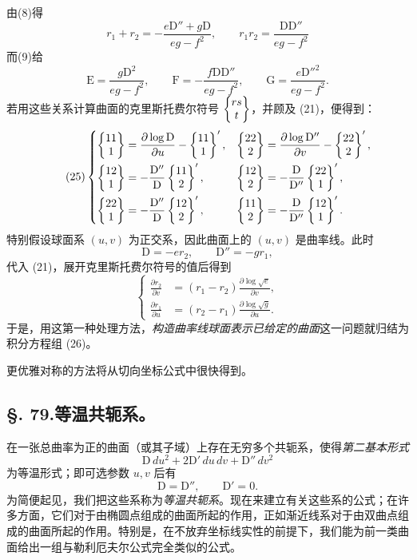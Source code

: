 由(8)得
\begin{equation}\tag{23}
 r_1+r_2=-\frac{e\mathrm D''+g\mathrm D}{eg-f^2},
 \qquad
 r_1r_2=\frac{\mathrm D\mathrm D''}{eg-f^2}
\end{equation}
而(9)给
\begin{equation}\tag{24}
 \mathrm E=\frac{g\mathrm D^2}{eg-f^2},
 \qquad
 \mathrm F=-\frac{f\mathrm D\mathrm D''}{eg-f^2},
 \qquad
 \mathrm G=\frac{e\mathrm D''^2}{eg-f^2}.
\end{equation}
若用这些关系计算曲面的克里斯托费尔符号 \(\left\{\begin{matrix}rs\\t\end{matrix}\right\}\)，并顾及 (21)，便得到：
\begin{equation}\tag{25}
\left\{
\begin{aligned}
\left\{\begin{matrix}11\\1\end{matrix}\right\}&=\frac{\partial\log\mathrm D}{\partial u}-\left\{\begin{matrix}11\\1\end{matrix}\right\}',
&
\left\{\begin{matrix}22\\2\end{matrix}\right\}&=\frac{\partial\log\mathrm D''}{\partial v}-\left\{\begin{matrix}22\\2\end{matrix}\right\}',\\
\left\{\begin{matrix}12\\1\end{matrix}\right\}&=-\frac{\mathrm D''}{\mathrm D}\left\{\begin{matrix}11\\2\end{matrix}\right\}',
&
\left\{\begin{matrix}12\\2\end{matrix}\right\}&=-\frac{\mathrm D}{\mathrm D''}\left\{\begin{matrix}22\\1\end{matrix}\right\}',\\
\left\{\begin{matrix}22\\1\end{matrix}\right\}&=-\frac{\mathrm D''}{\mathrm D}\left\{\begin{matrix}12\\2\end{matrix}\right\}',
&
\left\{\begin{matrix}11\\2\end{matrix}\right\}&=-\frac{\mathrm D}{\mathrm D''}\left\{\begin{matrix}12\\1\end{matrix}\right\}'.
\end{aligned}\right.
\end{equation}
特别假设球面系 \((u,v)\) 为正交系，因此曲面上的 \((u,v)\) 是曲率线。此时
\[
 \mathrm D=-er_2,
 \qquad
 \mathrm D''=-gr_1,
\]
代入 (21)，展开克里斯托费尔符号的值后得到
\begin{equation}\tag{26}
\left\{
\begin{aligned}
\frac{\partial r_2}{\partial v}&=(r_1-r_2)\frac{\partial\log\sqrt e}{\partial v},\\
\frac{\partial r_1}{\partial u}&=(r_2-r_1)\frac{\partial\log\sqrt g}{\partial u}.
\end{aligned}\right.
\end{equation}
于是，用这第一种处理方法，\emph{构造曲率线球面表示已给定的曲面}这一问题就归结为积分方程组 (26)。

更优雅对称的方法将从切向坐标公式中很快得到。


\subsection*{\S. 79.\quad 等温共轭系。}

在一张总曲率为正的曲面（或其子域）上存在无穷多个共轭系，使得\emph{第二基本形式}
\[
 \mathrm D\,du^2+2\mathrm D'\,du\,dv+\mathrm D''\,dv^2
\]
为等温形式；即可选参数 \(u,v\) 后有
\[
 \mathrm D=\mathrm D'',
 \qquad
 \mathrm D'=0.
\]
为简便起见，我们把这些系称为\emph{等温共轭系}。现在来建立有关这些系的公式；在许多方面，它们对于由椭圆点组成的曲面所起的作用，正如渐近线系对于由双曲点组成的曲面所起的作用。特别是，在不放弃坐标线实性的前提下，我们能为前一类曲面给出一组与勒利厄夫尔公式完全类似的公式。

